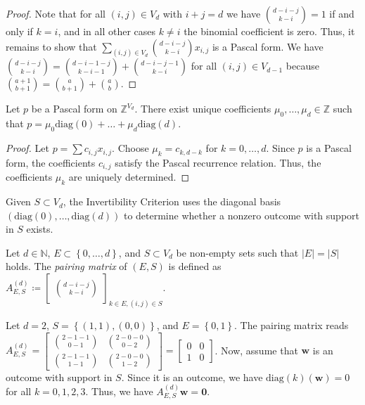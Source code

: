 \begin{proof}
    Note that for all \( (i,j) \in V_d \) with \( i+j = d \) we have \( \binom{d - i - j}{k-i} = 1 \) if and only if \( k= i \), and in all other cases \( k \neq i \) the binomial coefficient is zero. Thus, it remains to show that \( \sum_{(i,j) \in V_d}\binom{d - i - j}{k-i} x_{i,j} \) is a Pascal form. We have \(  \binom{d-i-j}{k-i} = \binom{d-i-1-j}{k-i-1} + \binom{d-i-j-1}{k-i} \)
    for all \( (i,j) \in V_{d-1} \) because \( \binom{a+1}{b+1} = \binom{a}{b+1} + \binom{a}{b}\).
\end{proof}

\begin{proposition}
    Let \( p \) be a Pascal form on \( \mathbb Z^{V_d} \). There exist unique coefficients \( \mu_0, \dots, \mu_d \in \mathbb{Z} \) such that 
    \( p = \mu_0 \mathrm{diag}(0) + \dots + \mu_d \mathrm{diag}(d) \).
\end{proposition}

\begin{proof}
    Let \( p = \sum c_{i,j}x_{i,j} \). Choose \( \mu_k = c_{k,d-k} \) for \( k=0, \dots, d \). Since \( p \) is a Pascal form, the coefficients \( c_{i,j} \) satisfy the Pascal recurrence relation. Thus, the coefficients \( \mu_k \) are uniquely determined.
\end{proof}

Given \( S \subset V_d \), the Invertibility Criterion uses the diagonal basis \( (\mathrm{diag}(0), \dots, \mathrm{diag}(d)) \) to determine whether a nonzero outcome with support in \( S \) exists.

\begin{definition}\label{def:pairing-matrix}
    Let \( d \in \mathbb{N} \), \( E \subset \left\{ 0, \dots, d \right\} \), and \( S \subset V_d \) be non-empty sets such that \( \lvert E \rvert = \lvert S \rvert \) holds. The \emph{pairing matrix} of \( (E,S) \) is defined as \( A^{(d)}_{E,S} \coloneqq \begin{bmatrix} \binom{d-i-j}{k-i} \end{bmatrix}_{k \in E, (i,j) \in S} \).
\end{definition}

\begin{example}
    Let \( d = 2 \), \( S = \left\{ (1,1), (0,0) \right\} \), and \( E = \left\{ 0,1 \right\} \). The pairing matrix reads \(  A^{(d)}_{E,S}  = \begin{bmatrix}
        \binom{2-1-1}{0-1} & \binom{2-0-0}{0-2} \\
        \binom{2-1-1}{1-1}  & \binom{2-0-0}{1-2}
    \end{bmatrix} = \begin{bmatrix}
        0 & 0 \\
        1 & 0
    \end{bmatrix} \). Now, assume that \( \mathbf{w} \) is an outcome with support in \( S \). Since it is an outcome, we have \( \mathrm{diag}(k)(\mathbf{w}) = 0 \) for all \( k = 0, 1,2,3 \). Thus, we have \(  A^{(d)}_{E,S} \mathbf w = \mathbf 0 \).
\end{example}


